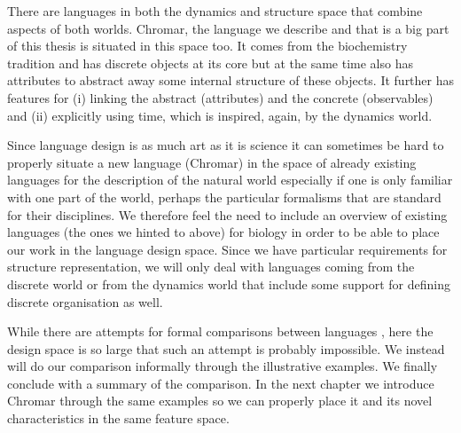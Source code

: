
There are languages in both the dynamics and structure space that combine
aspects of both worlds. Chromar, the language we describe and that is a big part
of this thesis is situated in this space too. It comes from the biochemistry
tradition and has discrete objects at its core but at the same time also has
attributes to abstract away some internal structure of these objects. It further
has features for (i) linking the abstract (attributes) and the concrete
(observables) and (ii) explicitly using time, which is inspired, again, by the
dynamics world.

Since language design is as much art as it is science it can sometimes be hard
to properly situate a new language (Chromar) in the space of already existing
languages for the description of the natural world especially if one is only
familiar with one part of the world, perhaps the particular formalisms that are
standard for their disciplines. We therefore feel the need to include an
overview of existing languages (the ones we hinted to above) for biology in
order to be able to place our work in the language design space. Since we have
particular requirements for structure representation, we will only deal with
languages coming from the discrete world or from the dynamics world that include
some support for defining discrete organisation as well.

While there are attempts for formal comparisons between languages
\citep{felleisen1991expressive}, here the design space is so large that such an
attempt is probably impossible. We instead will do our comparison informally
through the illustrative examples. We finally conclude with a summary of the
comparison. In the next chapter we introduce Chromar through the same examples
so we can properly place it and its novel characteristics in the same feature
space.


